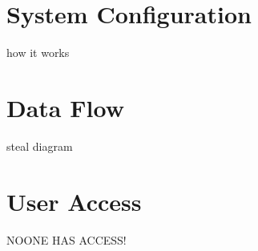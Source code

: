 \section{System Configuration}
how it works
\section{Data Flow}
steal diagram
\section{User Access}
NOONE HAS ACCESS!